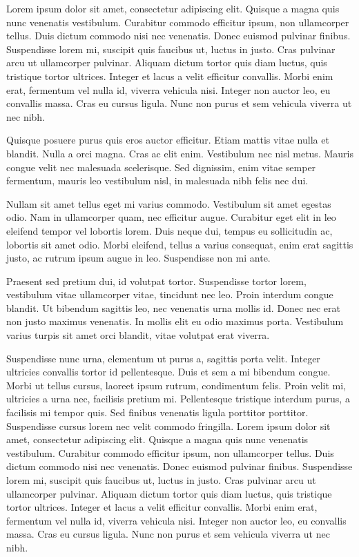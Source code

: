 \documentclass[12pt,a4paper,openright,twoside]{report}
\begin{document}
Lorem ipsum dolor sit amet, consectetur adipiscing elit. Quisque a magna quis nunc venenatis vestibulum. Curabitur commodo efficitur ipsum, non ullamcorper tellus. Duis dictum commodo nisi nec venenatis. Donec euismod pulvinar finibus. Suspendisse lorem mi, suscipit quis faucibus ut, luctus in justo. Cras pulvinar arcu ut ullamcorper pulvinar. Aliquam dictum tortor quis diam luctus, quis tristique tortor ultrices. Integer et lacus a velit efficitur convallis. Morbi enim erat, fermentum vel nulla id, viverra vehicula nisi. Integer non auctor leo, eu convallis massa. Cras eu cursus ligula. Nunc non purus et sem vehicula viverra ut nec nibh.

Quisque posuere purus quis eros auctor efficitur. Etiam mattis vitae nulla et blandit. Nulla a orci magna. Cras ac elit enim. Vestibulum nec nisl metus. Mauris congue velit nec malesuada scelerisque. Sed dignissim, enim vitae semper fermentum, mauris leo vestibulum nisl, in malesuada nibh felis nec dui.

Nullam sit amet tellus eget mi varius commodo. Vestibulum sit amet egestas odio. Nam in ullamcorper quam, nec efficitur augue. Curabitur eget elit in leo eleifend tempor vel lobortis lorem. Duis neque dui, tempus eu sollicitudin ac, lobortis sit amet odio. Morbi eleifend, tellus a varius consequat, enim erat sagittis justo, ac rutrum ipsum augue in leo. Suspendisse non mi ante.

Praesent sed pretium dui, id volutpat tortor. Suspendisse tortor lorem, vestibulum vitae ullamcorper vitae, tincidunt nec leo. Proin interdum congue blandit. Ut bibendum sagittis leo, nec venenatis urna mollis id. Donec nec erat non justo maximus venenatis. In mollis elit eu odio maximus porta. Vestibulum varius turpis sit amet orci blandit, vitae volutpat erat viverra.

Suspendisse nunc urna, elementum ut purus a, sagittis porta velit. Integer ultricies convallis tortor id pellentesque. Duis et sem a mi bibendum congue. Morbi ut tellus cursus, laoreet ipsum rutrum, condimentum felis. Proin velit mi, ultricies a urna nec, facilisis pretium mi. Pellentesque tristique interdum purus, a facilisis mi tempor quis. Sed finibus venenatis ligula porttitor porttitor. Suspendisse cursus lorem nec velit commodo fringilla.
Lorem ipsum dolor sit amet, consectetur adipiscing elit. Quisque a magna quis nunc venenatis vestibulum. Curabitur commodo efficitur ipsum, non ullamcorper tellus. Duis dictum commodo nisi nec venenatis. Donec euismod pulvinar finibus. Suspendisse lorem mi, suscipit quis faucibus ut, luctus in justo. Cras pulvinar arcu ut ullamcorper pulvinar. Aliquam dictum tortor quis diam luctus, quis tristique tortor ultrices. Integer et lacus a velit efficitur convallis. Morbi enim erat, fermentum vel nulla id, viverra vehicula nisi. Integer non auctor leo, eu convallis massa. Cras eu cursus ligula. Nunc non purus et sem vehicula viverra ut nec nibh.
\end{document}
